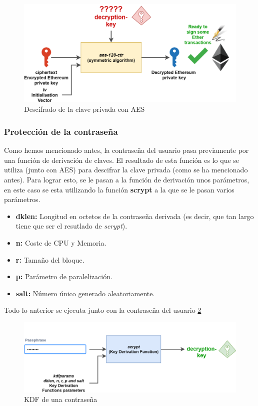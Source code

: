 \begin{figure}[h!]
  \centering
  \includegraphics[width=0.8\linewidth]{figs/Desarrollo/Keystore/keystore_AES}
  \caption[Descifrado de la clave privada con AES]{Descifrado de la clave privada con AES}
  \label{fig:keystore_aes}
\end{figure}

\subsubsection{Protección de la contraseña}

Como hemos mencionado antes, la contraseña del usuario pasa previamente por una función de derivación de claves. El resultado de esta función es lo que se utiliza (junto con AES) para descifrar la clave privada (como se ha mencionado antes). Para lograr esto, se le pasan a la función de derivación unos parámetros, en este caso se esta utilizando la función \textbf{scrypt}\cite{scrypt} a la que se le pasan varios parámetros.
\begin{itemize}
\item \textbf{dklen:} Longitud en octetos de la contraseña derivada (es decir, que tan largo tiene que ser el resutlado de \emph{scrypt}).
\item \textbf{n:} Coste de CPU y Memoria.
\item \textbf{r:} Tamaño del bloque.
\item \textbf{p:} Parámetro de paralelización.
\item \textbf{salt:} Número único generado aleatoriamente.
\end{itemize}

Todo lo anterior se ejecuta junto con la contraseña del usuario \ref{fig:keystore_scrypt}

\begin{figure}[h!]
  \centering
  \includegraphics[width=0.8\linewidth]{figs/Desarrollo/Keystore/keystore_scrypt}
  \caption[KDF de una contraseña]{KDF de una contraseña}
  \label{fig:keystore_scrypt}
\end{figure}

